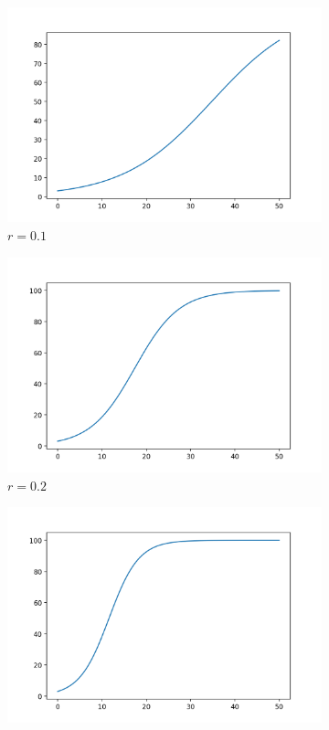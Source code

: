 \documentclass[12pt, letterpaper]{article}
\begin{document}
\begin{figure}[h]
  \caption{Logistic equation $p_0=3$ $k=100$}
  \label{fig:progression}
  \centering
  \begin{subfigure}[b]{.3\linewidth}
    \includegraphics[width=\linewidth]{Logistic/logistic01.png}
    \caption{$r=0.1$}
  \end{subfigure}
  \begin{subfigure}[b]{.3\linewidth}
    \includegraphics[width=\linewidth]{Logistic/logistic02.png}
    \caption{$r=0.2$}
  \end{subfigure}
  \begin{subfigure}[b]{.3\linewidth}
    \includegraphics[width=\linewidth]{Logistic/logistic03.png}

\end{subfigure}
\end{figure}
\end{document}
